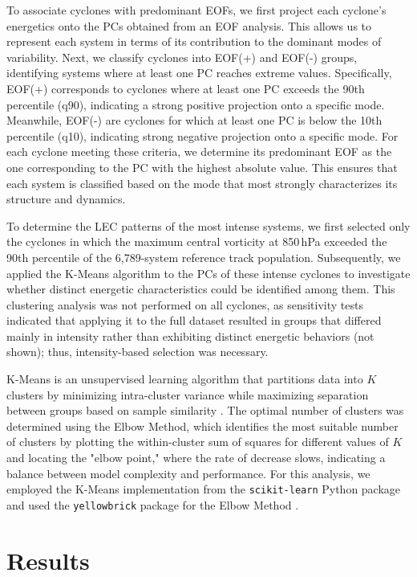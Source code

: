 \documentclass[pdflatex,sn-chicago]{sn-jnl}%
\theoremstyle{plain}
\theoremstyle{definition}
\theoremstyle{remark}
\theoremstyle{definition}
\begin{document}
To associate cyclones with predominant EOFs, we first project each cyclone's energetics onto the PCs obtained from an EOF analysis. This allows us to represent each system in terms of its contribution to the dominant modes of variability. Next, we classify cyclones into EOF(+) and EOF(-) groups, identifying systems where at least one PC reaches extreme values. Specifically, EOF(+) corresponds to cyclones where at least one PC exceeds the 90th percentile (q90), indicating a strong positive projection onto a specific mode. Meanwhile, EOF(-) are  cyclones for which at least one PC is below the 10th percentile (q10), indicating strong negative projection onto a specific mode. For each cyclone meeting these criteria, we determine its predominant EOF as the one corresponding to the PC with the highest absolute value. This ensures that each system is classified based on the mode that most strongly characterizes its structure and dynamics.

To determine the LEC patterns of the most intense systems, we first selected only the cyclones in which the maximum central vorticity at 850\,hPa exceeded the 90th percentile of the 6,789-system reference track population. Subsequently, we applied the K-Means algorithm to the PCs of these intense cyclones to investigate whether distinct energetic characteristics could be identified among them. This clustering analysis was not performed on all cyclones, as sensitivity tests indicated that applying it to the full dataset resulted in groups that differed mainly in intensity rather than exhibiting distinct energetic behaviors (not shown); thus, intensity-based selection was necessary.

K-Means is an unsupervised learning algorithm that partitions data into \( K \) clusters by minimizing intra-cluster variance while maximizing separation between groups based on sample similarity \citep{macqueen1967,hartiganwong1979}. The optimal number of clusters was determined using the Elbow Method, which identifies the most suitable number of clusters by plotting the within-cluster sum of squares for different values of \( K \) and locating the "elbow point," where the rate of decrease slows, indicating a balance between model complexity and performance. For this analysis, we employed the K-Means implementation from the \texttt{scikit-learn} Python package \citep{hao2019machine} and used the \texttt{yellowbrick} package for the Elbow Method \citep{bengfort2019yellowbrick}.



\section{Results}\label{sec:results}
\end{document}
